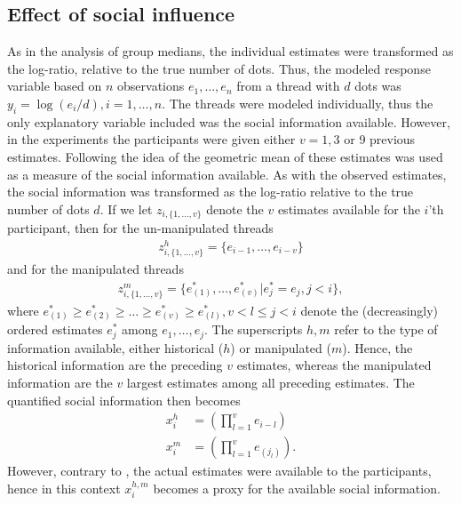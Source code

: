 \documentclass[10pt,a4paper,twocolumn,lineno]{article}
\begin{document}
\subsection{Effect of social influence}
As in the analysis of group medians, the individual estimates were transformed as the log-ratio, relative to the true number of dots. Thus, the modeled response variable based on $n$ observations $e_1,\dots,e_n$ from a thread with $d$ dots was $y_i = \log(e_i/d), i=1,\dots,n$. The threads were modeled individually, thus the only explanatory variable included was the social information available. 
However, in the experiments the participants were given either $v=1, 3$ or 9 previous estimates. Following the idea of \citep{jayles2017social} the geometric mean of these estimates was used as a measure of the social information available. As with the observed estimates, the social information was transformed as the log-ratio relative to the true number of dots $d$. If we let $z_{i,\{1,\dots,v\}}$ denote the $v$ estimates available for the $i$'th participant, then for the un-manipulated threads 
\begin{align*}
	z^h_{i, \{1,\dots,v\}} = \{e_{i-1},\dots,e_{i-v}\}
\end{align*}
and for the manipulated threads
\begin{align*}
	z^m_{i, \{1,\dots,v\}} = \{e^*_{(1)},\dots,e^*_{(v)} | e^*_j=e_j, j<i\},
\end{align*}
where $e^*_{(1)}\geq e^*_{(2)}\geq\dots\geq e^*_{(v)}\geq e^*_{(l)}, v<l\leq j<i$ denote the (decreasingly) ordered estimates $e^*_j$ among $e_1,\dots,e_j$. The superscripts $h,m$ refer to the type of information available, either historical ($h$) or manipulated ($m$). Hence, the historical information are the preceding $v$ estimates, whereas the manipulated information are the $v$ largest estimates among all preceding estimates. The quantified social information then becomes
\begin{align*}
	x_i^h &= \left(\prod_{l=1}^v e_{i-l} \right) \\
	x_i^m &= \left(\prod_{l=1}^v e_{(j_l)} \right).
\end{align*}
However, contrary to \citep{jayles2017social}, the actual estimates were available to the participants, hence in this context $x_i^{h,m}$ becomes a proxy for the available social information. %
\end{document}
